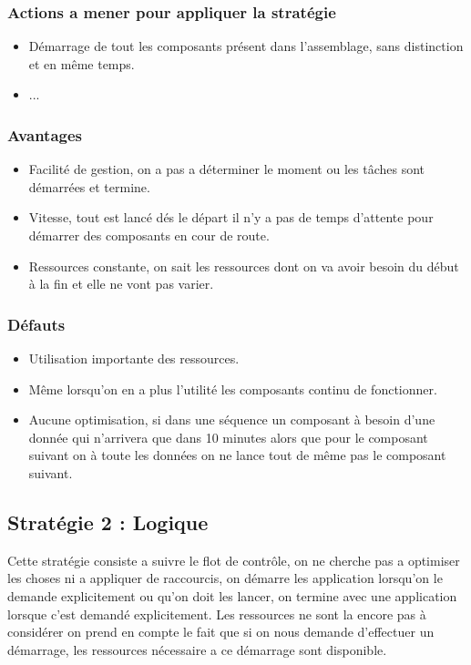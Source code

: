 \documentclass{article}
\begin{document}
\subsubsection{Actions a mener pour appliquer la stratégie}
\begin{itemize}
    \item Démarrage de tout les composants présent dans l'assemblage, sans distinction et en même temps.
    \item ...
\end{itemize}
\subsubsection{Avantages}
\begin{itemize}
    \item Facilité de gestion, on a pas a déterminer le moment ou les tâches sont démarrées et termine.
    \item Vitesse, tout est lancé dés le départ il n'y a pas de temps d'attente pour démarrer des composants en cour de route.
    \item Ressources constante, on sait les ressources dont on va avoir besoin du début à la fin et elle ne vont pas varier.
\end{itemize}
\subsubsection{Défauts}
\begin{itemize}
    \item Utilisation importante des ressources.
    \item Même lorsqu'on en a plus l'utilité les composants continu de fonctionner.
    \item Aucune optimisation, si dans une séquence un composant à besoin d'une donnée qui n'arrivera que dans 10 minutes alors que pour le composant suivant on à toute les données on ne lance tout de même pas le composant suivant.
\end{itemize}
\subsection{Stratégie 2 : Logique}
Cette stratégie consiste a suivre le flot de contrôle, on ne cherche pas a optimiser les choses ni a appliquer de raccourcis, on démarre les application lorsqu'on le demande explicitement ou qu'on doit les lancer, on termine avec une application lorsque c'est demandé explicitement. Les ressources ne sont la encore pas à considérer on prend en compte le fait que si on nous demande d'effectuer un démarrage, les ressources nécessaire a ce démarrage sont disponible.
\end{document}
